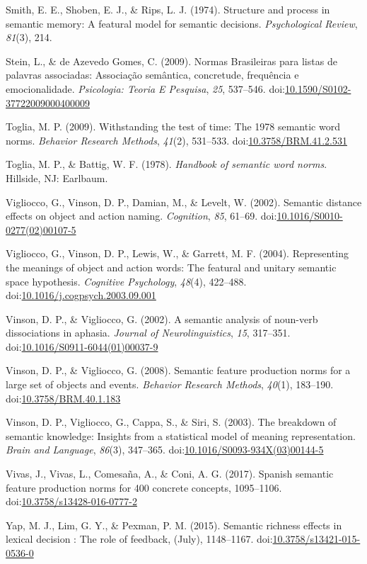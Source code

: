 \documentclass[english,man]{apa6}
\theoremstyle{definition}
\theoremstyle{definition}
\theoremstyle{definition}
\theoremstyle{remark}
\begin{document}
\hypertarget{ref-Smith1974}{}
Smith, E. E., Shoben, E. J., \& Rips, L. J. (1974). Structure and
process in semantic memory: A featural model for semantic decisions.
\emph{Psychological Review}, \emph{81}(3), 214.

\hypertarget{ref-Stein2009}{}
Stein, L., \& de Azevedo Gomes, C. (2009). Normas Brasileiras para
listas de palavras associadas: Associação semântica, concretude,
frequência e emocionalidade. \emph{Psicologia: Teoria E Pesquisa},
\emph{25}, 537--546.
doi:\href{https://doi.org/10.1590/S0102-37722009000400009}{10.1590/S0102-37722009000400009}

\hypertarget{ref-Toglia2009}{}
Toglia, M. P. (2009). Withstanding the test of time: The 1978 semantic
word norms. \emph{Behavior Research Methods}, \emph{41}(2), 531--533.
doi:\href{https://doi.org/10.3758/BRM.41.2.531}{10.3758/BRM.41.2.531}

\hypertarget{ref-Toglia1978}{}
Toglia, M. P., \& Battig, W. F. (1978). \emph{Handbook of semantic word
norms}. Hillside, NJ: Earlbaum.

\hypertarget{ref-Vigliocco2002}{}
Vigliocco, G., Vinson, D. P., Damian, M., \& Levelt, W. (2002). Semantic
distance effects on object and action naming. \emph{Cognition},
\emph{85}, 61--69.
doi:\href{https://doi.org/10.1016/S0010-0277(02)00107-5}{10.1016/S0010-0277(02)00107-5}

\hypertarget{ref-Vigliocco2004}{}
Vigliocco, G., Vinson, D. P., Lewis, W., \& Garrett, M. F. (2004).
Representing the meanings of object and action words: The featural and
unitary semantic space hypothesis. \emph{Cognitive Psychology},
\emph{48}(4), 422--488.
doi:\href{https://doi.org/10.1016/j.cogpsych.2003.09.001}{10.1016/j.cogpsych.2003.09.001}

\hypertarget{ref-Vinson2002}{}
Vinson, D. P., \& Vigliocco, G. (2002). A semantic analysis of noun-verb
dissociations in aphasia. \emph{Journal of Neurolinguistics}, \emph{15},
317--351.
doi:\href{https://doi.org/10.1016/S0911-6044(01)00037-9}{10.1016/S0911-6044(01)00037-9}

\hypertarget{ref-Vinson2008}{}
Vinson, D. P., \& Vigliocco, G. (2008). Semantic feature production
norms for a large set of objects and events. \emph{Behavior Research
Methods}, \emph{40}(1), 183--190.
doi:\href{https://doi.org/10.3758/BRM.40.1.183}{10.3758/BRM.40.1.183}

\hypertarget{ref-Vinson2003}{}
Vinson, D. P., Vigliocco, G., Cappa, S., \& Siri, S. (2003). The
breakdown of semantic knowledge: Insights from a statistical model of
meaning representation. \emph{Brain and Language}, \emph{86}(3),
347--365.
doi:\href{https://doi.org/10.1016/S0093-934X(03)00144-5}{10.1016/S0093-934X(03)00144-5}

\hypertarget{ref-Vivas2017}{}
Vivas, J., Vivas, L., Comesaña, A., \& Coni, A. G. (2017). Spanish
semantic feature production norms for 400 concrete concepts, 1095--1106.
doi:\href{https://doi.org/10.3758/s13428-016-0777-2}{10.3758/s13428-016-0777-2}

\hypertarget{ref-Yap2015}{}
Yap, M. J., Lim, G. Y., \& Pexman, P. M. (2015). Semantic richness
effects in lexical decision : The role of feedback, (July), 1148--1167.
doi:\href{https://doi.org/10.3758/s13421-015-0536-0}{10.3758/s13421-015-0536-0}
\end{document}
